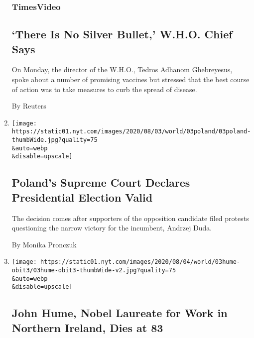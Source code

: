 \begin{enumerate}
  \hypertarget{timesvideo}{%
  \subsubsection{TimesVideo}\label{timesvideo}}

  \hypertarget{there-is-no-silver-bullet-who-chief-says}{%
  \subsection{`There Is No Silver Bullet,' W.H.O. Chief
  Says}\label{there-is-no-silver-bullet-who-chief-says}}

  On Monday, the director of the W.H.O., Tedros Adhanom Ghebreyesus,
  spoke about a number of promising vaccines but stressed that the best
  course of action was to take measures to curb the spread of disease.

  By Reuters
\item
  \href{/2020/08/03/world/europe/poland-court-presidential-election.html}{}

  \texttt{[image: https://static01.nyt.com/images/2020/08/03/world/03poland/03poland-thumbWide.jpg?quality=75\\\&auto=webp\\\&disable=upscale]}

  \hypertarget{polands-supreme-court-declares-presidential-election-valid}{%
  \subsection{Poland's Supreme Court Declares Presidential Election
  Valid}\label{polands-supreme-court-declares-presidential-election-valid}}

  The decision comes after supporters of the opposition candidate filed
  protests questioning the narrow victory for the incumbent, Andrzej
  Duda.

  By Monika Pronczuk
\item
  \href{/2020/08/03/obituaries/john-hume-dies.html}{}

  \texttt{[image: https://static01.nyt.com/images/2020/08/04/world/03hume-obit3/03hume-obit3-thumbWide-v2.jpg?quality=75\\\&auto=webp\\\&disable=upscale]}

  \hypertarget{john-hume-nobel-laureate-for-work-in-northern-ireland-dies-at-83}{%
  \subsection{John Hume, Nobel Laureate for Work in Northern Ireland,
  Dies at
  83}\label{john-hume-nobel-laureate-for-work-in-northern-ireland-dies-at-83}}


\end{enumerate}
